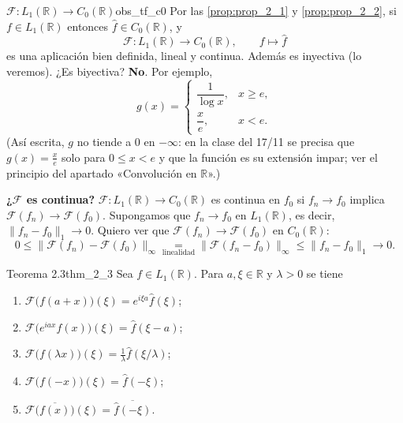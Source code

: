 \begin{observacion}{$\mathcal{F} : L_1(\mathbb{R}) \to C_0(\mathbb{R})$}{obs_tf_c0}
Por las \cref{prop:prop_2_1} y \cref{prop:prop_2_2}, si $f \in L_1(\mathbb{R})$ entonces $\hat{f} \in C_0(\mathbb{R})$, y
\[
\mathcal{F} : L_1(\mathbb{R}) \longrightarrow C_0(\mathbb{R}), \qquad f \longmapsto \hat{f}
\]
es una aplicación bien definida, lineal y continua. Además es inyectiva (lo veremos). ¿Es biyectiva? \textbf{No}. Por ejemplo,
\[
g(x) = \begin{cases} \dfrac{1}{\log x}, & x \ge e, \\[6pt] \dfrac{x}{e}, & x < e. \end{cases}
\]
(Así escrita, $g$ no tiende a $0$ en $-\infty$: en la clase del 17/11 se precisa que $g(x) = \frac{x}{e}$ solo para $0 \le x < e$ y que la función es su extensión impar; ver el principio del apartado «Convolución en $\mathbb{R}$».)

\textbf{¿$\mathcal{F}$ es continua?} $\mathcal{F} : L_1(\mathbb{R}) \to C_0(\mathbb{R})$ es continua en $f_0$ si $f_n \to f_0$ implica $\mathcal{F}(f_n) \to \mathcal{F}(f_0)$. Supongamos que $f_n \to f_0$ en $L_1(\mathbb{R})$, es decir, $\|f_n - f_0\|_1 \to 0$. Quiero ver que $\mathcal{F}(f_n) \to \mathcal{F}(f_0)$ en $C_0(\mathbb{R})$:
\[
0 \le \|\mathcal{F}(f_n) - \mathcal{F}(f_0)\|_\infty \underset{\text{linealidad}}{=} \|\mathcal{F}(f_n - f_0)\|_\infty \le \|f_n - f_0\|_1 \longrightarrow 0.
\]
\end{observacion}

\begin{teorema}{Teorema 2.3}{thm_2_3}
Sea $f \in L_1(\mathbb{R})$. Para $a, \xi \in \mathbb{R}$ y $\lambda > 0$ se tiene
\begin{enumerate}
\item[(1)] $\mathcal{F}\big(f(a+x)\big)(\xi) = e^{i\xi a}\hat{f}(\xi)$;
\item[(2)] $\mathcal{F}\big(e^{iax}f(x)\big)(\xi) = \hat{f}(\xi - a)$;
\item[(3)] $\mathcal{F}\big(f(\lambda x)\big)(\xi) = \frac{1}{\lambda}\hat{f}(\xi/\lambda)$;
\item[(4)] $\mathcal{F}\big(f(-x)\big)(\xi) = \hat{f}(-\xi)$;
\item[(5)] $\mathcal{F}\big(\overline{f(x)}\big)(\xi) = \overline{\hat{f}(-\xi)}$.
\end{enumerate}
\end{teorema}

